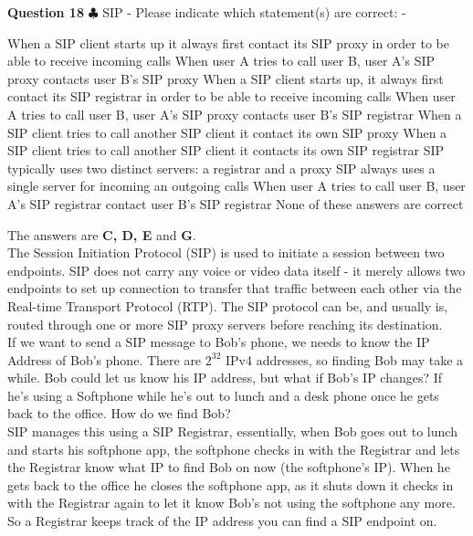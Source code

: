 \documentclass[en]{sourcefiles/eplexam}
\newcounter{choice}
\renewcommand\thechoice{\textbf{\Alph{choice}}}
\newcommand\choicelabel{\thechoice$\quad$}
\newenvironment{choices}%
  {\list{\choicelabel}%
     {\usecounter{choice}\def\makelabel##1{\hss\llap{##1}}%
       \settowidth{\leftmargin}{W.\hskip\labelsep\hskip 2.5em}%
       \def\choice{%
         \item
       } %
       \labelwidth\leftmargin\advance\labelwidth-\labelsep
       \topsep=0pt
       \partopsep=0pt
     }%
  }%
  {\endlist}
\begin{document}
\textbf{Question 18} $\clubsuit$ SIP - Please indicate which statement(s) are correct:
\begin{choices}

    \choice When a SIP client starts up it always first contact its SIP proxy in order to be able to receive incoming calls
    \choice When user A tries to call user B, user A's SIP proxy contacts user B's SIP proxy
    \choice When a SIP client starts up, it always first contact its SIP registrar in order to be able to receive incoming calls
    \choice When user A tries to call user B, user A's SIP proxy contacts user B's SIP registrar
    \choice When a SIP client tries to call another SIP client it contact its own SIP proxy
    \choice When a SIP client tries to call another SIP client it contacts its own SIP registrar
    \choice SIP typically uses two distinct servers: a registrar and a proxy
    \choice SIP always uses a single server for incoming an outgoing calls
    \choice When user A tries to call user B, user A's SIP registrar contact user B's SIP registrar
     \choice None of these answers are correct
\end{choices}
\begin{solution}
The answers are \textbf{C, D, E} and \textbf{G}.\\

\noindent The Session Initiation Protocol (SIP) is used to initiate a session between two endpoints. SIP does not carry any voice or video data itself - it merely allows two endpoints to set up connection to transfer that traffic between each other via the Real-time Transport Protocol (RTP). The SIP protocol can be, and usually is, routed through one or more SIP proxy servers before reaching its destination.\\

\noindent If we want to send a SIP message to Bob’s phone, we needs to know the IP Address of Bob’s phone. There are $2^{32}$ IPv4 addresses, so finding Bob may take a while.
Bob could let us know his IP address, but what if Bob’s IP changes? If he’s using a Softphone while he’s out to lunch and a desk phone once he gets back to the office. How do we find Bob?\\

\noindent SIP manages this using a SIP Registrar, essentially, when Bob goes out to lunch and starts his softphone app, the softphone checks in with the Registrar and lets the Registrar know what IP to find Bob on now (the softphone’s IP).
When he gets back to the office he closes the softphone app, as it shuts down it checks in with the Registrar again to let it know Bob’s not using the softphone any more.\\

\noindent So a Registrar keeps track of the IP address you can find a SIP endpoint on.

\end{solution}
\end{document}
